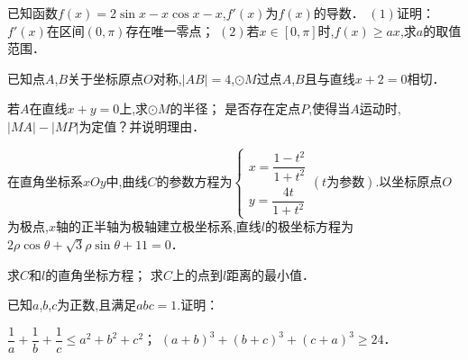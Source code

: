 \documentclass[list]{BHCexam}
\begin{document}
\begin{groups}
\begin{questions}[s]
\question[12] 已知函数$f(x)=2\sin x-x\cos x-x$,$f ' (x)$为$f(x)$的导数．  $(1)$证明：$f ' (x)$在区间$(0 ,  \pi )$存在唯一零点； $(2)$若$x \in [0 ,  \pi ]$时,$f(x)\geqslant ax$,求$a$的取值范围．
\begin{solution}{6cm}
\end{solution}

\question[12] 已知点$A$,$B$关于坐标原点$O$对称,$|AB|=4$,$ \odot M$过点$A$,$B$且与直线$x+2=0$相切．
\begin{subquestions}
    \subquestion 若$A$在直线$x+y=0$上,求$ \odot M$的半径； 
    \subquestion 是否存在定点$P$,使得当$A$运动时,$|MA|-|MP|$为定值？并说明理由．
\end{subquestions}
\begin{solution}{6cm}
\end{solution}

\question[10] 在直角坐标系$xOy$中,曲线$C$的参数方程为$\begin{cases} x=\dfrac{1-t^{2}}{1+t^{2}} \\ y=\dfrac{4t}{1+t^{2}} \end{cases} (t\text{为参数})$.以坐标原点$O$为极点,$x$轴的正半轴为极轴建立极坐标系,直线$l$的极坐标方程为$2 \rho \cos \theta + \sqrt{3}  \rho \sin \theta +11=0$．
\begin{subquestions}
    \subquestion 求$C$和$l$的直角坐标方程； 
    \subquestion 求$C$上的点到$l$距离的最小值．
\end{subquestions}
\begin{solution}{6cm}

\end{solution}

\question[12] 已知$a$,$b$,$c$为正数,且满足$abc=1.$证明： 
\begin{subquestions}
    \subquestion $\dfrac{1}{a} + \dfrac{1}{b} + \dfrac{1}{c} \leqslant a ^{2} +b ^{2} +c ^{2}$； 
    \subquestion $(a+b) ^{3} +(b+c) ^{3} +(c+a) ^{3} \geqslant 24$．
\end{subquestions}
\begin{solution}{6cm}
\end{solution}
\end{questions}
\end{groups}
\end{document}

